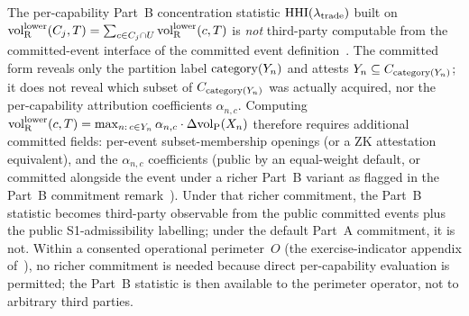 \begin{remark}
\label{rem:wireheading_part_b_obs}
The per-capability Part~B concentration statistic
$\mathrm{HHI}(\lambda_{\mathrm{trade}})$ built on
${\operatorname{vol}_{\mathrm{R}}^{\mathrm{lower}}}(C_j, T) = \sum_{c \in C_j \cap U} {\operatorname{vol}_{\mathrm{R}}^{\mathrm{lower}}}(c, T)$
is \emph{not} third-party computable from the committed-event
interface of the committed event definition~\citep[Revealed~Sacrifice]{lasser2026paper8a}.  The
committed form reveals only the partition label $\mathrm{category}(Y_{n})$ and
attests $Y_n \subseteq C_{\mathrm{category}(Y_{n})}$; it does not reveal which
subset of $C_{\mathrm{category}(Y_{n})}$ was actually acquired, nor the
per-capability attribution coefficients $\alpha_{n,c}$.
Computing ${\operatorname{vol}_{\mathrm{R}}^{\mathrm{lower}}}(c, T) =
\max_{n :\, c \in Y_n} \alpha_{n,c} \cdot \Delta{\operatorname{vol}_{\mathrm{P}}}(X_n)$
therefore requires additional committed fields: per-event
subset-membership openings (or a ZK attestation equivalent), and
the $\alpha_{n,c}$ coefficients (public by an equal-weight
default, or committed alongside the event under a richer
Part~B variant as flagged in the Part~B commitment remark~\citep[Revealed~Sacrifice]{lasser2026paper8a}).
Under that richer commitment, the Part~B statistic becomes
third-party observable from the public committed events plus
the public S1-admissibility labelling; under the default Part~A
commitment, it is not.  Within a consented operational perimeter~$O$
(the exercise-indicator appendix of~\citep[Revealed~Sacrifice]{lasser2026paper8a}), no richer commitment is
needed because direct per-capability evaluation is permitted;
the Part~B statistic is then available to the perimeter
operator, not to arbitrary third parties.
\end{remark}
